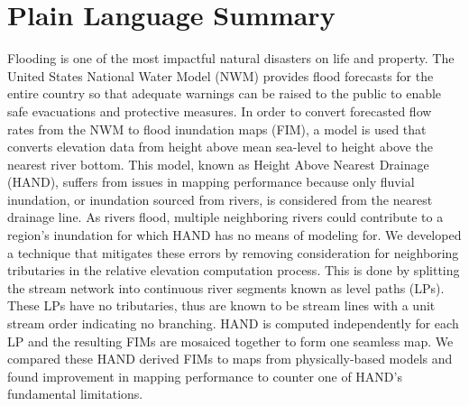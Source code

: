 \section*{Plain Language Summary}
Flooding is one of the most impactful natural disasters on life and property.
The United States National Water Model (NWM) provides flood forecasts for the entire country so that adequate warnings can be raised to the public to enable safe evacuations and protective measures.
In order to convert forecasted flow rates from the NWM to flood inundation maps (FIM), a model is used that converts elevation data from height above mean sea-level to height above the nearest river bottom.
This model, known as Height Above Nearest Drainage (HAND), suffers from issues in mapping performance because only fluvial inundation, or inundation sourced from rivers, is considered from the nearest drainage line.
As rivers flood, multiple neighboring rivers could contribute to a region's inundation for which HAND has no means of modeling for.
We developed a technique that mitigates these errors by removing consideration for neighboring tributaries in the relative elevation computation process.
This is done by splitting the stream network into continuous river segments known as level paths (LPs).
These LPs have no tributaries, thus are known to be stream lines with a unit stream order indicating no branching.
HAND is computed independently for each LP and the resulting FIMs are mosaiced together to form one seamless map.
We compared these HAND derived FIMs to maps from physically-based models and found improvement in mapping performance to counter one of HAND's fundamental limitations.
%
